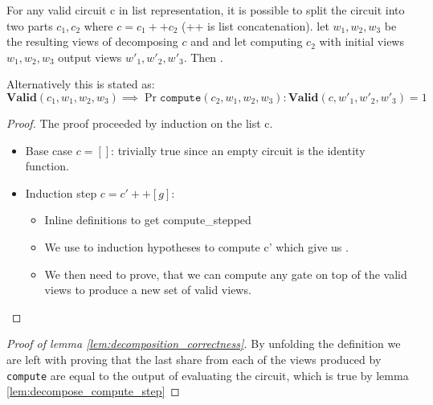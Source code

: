\begin{lemma}
  \label{lem:decompose_compute_step}
  For any valid circuit c in list representation, it is possible to split the circuit into two parts
  $c_{1}, c_{2}$ where $c = c_{1} ++ c_{2}$ (++ is list concatenation).
  let $w_{1}, w_{2}, w_{3}$ be the resulting views of decomposing $c$ and
   and let computing $c_{2}$ with initial
  views $w_{1}, w_{2}, w_{3}$ output views $w'_{1}, w'_{2}, w'_{3}$.
  Then .

  Alternatively this is stated as:
  \[
    \textbf{Valid}(c_{1}, w_{1}, w_{2}, w_{3})  \implies
    \Pr{ \texttt{compute}(c_{2}, w_{1}, w_{2}, w_{3}) : \textbf{Valid}(c, w'_{1} , w'_{2}, w'_{3}) } = 1
  \]

\end{lemma}
\begin{proof}
  The proof proceeded by induction on the list c.

  \begin{itemize}
    \item Base case $c = []$:
        trivially true since an empty circuit is the identity function.
    \item Induction step $c = c' ++ [g]$:
      \begin{itemize}
        \item Inline definitions to get compute\_stepped
        \item We use to induction hypotheses to compute c' which give us
              .
        \item We then need to prove, that we can compute any gate on top of the
          valid views to produce a new set of valid views.
      \end{itemize}
  \end{itemize}

\end{proof}

\begin{proof}[Proof of lemma \ref{lem:decomposition_correctness}]
  By unfolding the definition we are left with proving that the last share from
  each of the views produced by \texttt{compute} are equal to the output of
  evaluating the circuit, which is true by lemma \ref{lem:decompose_compute_step}
\end{proof}



